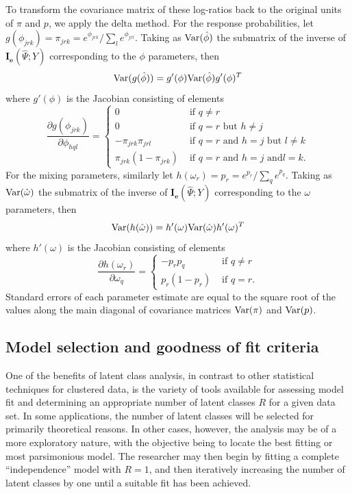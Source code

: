 \documentclass[letterpaper,12pt]{article}
\begin{document}
To transform the covariance matrix of these log-ratios back to the original units of $\pi$ and $p$, we apply the delta method. For the response probabilities, let $g(\phi_{jrk}) = \pi_{jrk} = e^{\phi_{jrk}} / \sum_l e^{\phi_{jrl}}$. Taking as ${\rm Var}(\hat \phi)$ the submatrix of the inverse of $\boldsymbol{I_e}(\hat \Psi;Y)$ corresponding to the $\phi$ parameters, then $$ {\rm Var}(g(\hat \phi)) = g'(\phi) {\rm Var}(\hat \phi) g'(\phi)^T $$ where $g'(\phi)$ is the Jacobian consisting of elements
\begin{equation*}
\frac{\partial g(\phi_{jrk})}{\partial \phi_{hql}}=
\begin{cases}
0 & \text{ if } q \neq r \\
0 & \text{ if } q=r \text{ but } h \neq j \\
-\pi_{jrk} \pi_{jrl} & \text{ if } q=r \text{ and } h=j \text{ but } l \neq k \\
\pi_{jrk}(1-\pi_{jrk}) & \text{ if } q=r \text{ and } h=j \text{ and
} l=k.
\end{cases}
\end{equation*}
For the mixing parameters, similarly let $h(\omega_r) = p_r = e^{p_r} / \sum_q e^{p_q}$. Taking as ${\rm Var}(\hat \omega)$ the submatrix of the inverse of $\boldsymbol{I_e}(\hat \Psi;Y)$ corresponding to the $\omega$ parameters, then $$ {\rm Var}(h(\hat \omega)) = h'(\omega) {\rm Var}(\hat \omega) h'(\omega)^T $$ where $h'(\omega)$ is the Jacobian consisting of elements
\begin{equation*}
\frac{\partial h(\omega_r)}{\partial \omega_q}=
\begin{cases}
-p_r p_q   & \text{ if } q \neq r \\
p_r(1-p_r) & \text{ if } q=r.
\end{cases}
\end{equation*}
Standard errors of each parameter estimate are equal to the square root of the values along the main diagonal of covariance matrices ${\rm Var}(\pi)$ and ${\rm Var}(p)$.


\subsection{Model selection and goodness of fit criteria} \label{s.model-selection}

One of the benefits of latent class analysis, in contrast to other statistical techniques for clustered data, is the variety of tools available for assessing model fit and determining an appropriate number of latent classes $R$ for a given data set.  In some applications, the number of latent classes will be selected for primarily theoretical reasons.  In other cases, however, the analysis may be of a more exploratory nature, with the objective being to locate the best fitting or most parsimonious model.  The researcher may then begin by fitting a complete ``independence'' model with $R=1$, and then iteratively increasing the number of latent classes by one until a suitable fit has been achieved.
\end{document}
